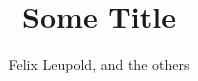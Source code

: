 \documentclass[runningheads]{llncs}
\begin{document}
\title{Some Title}
\author{Felix Leupold, and the others}
\maketitle



\vspace*{\fill}
\begin{abstract}

\end{abstract}
\vspace*{\fill}

\newpage

%

\end{document}
